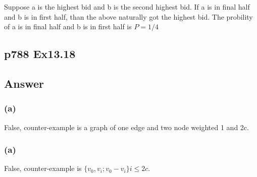 \documentclass[a4paper]{article}
\begin{document}
Suppose a is the highest bid and b is the second highest bid. If a is in final half and b is in first half, than the above naturally got the highest bid. The probility of a is in final half and b is in first half is $P=1/4$

\subsection*{p788 Ex13.18}
\subsection*{Answer}
\subsubsection*{(a)}
False, counter-example is a graph of one edge and two node weighted 1 and 2c.

\subsubsection*{(a)}
False, counter-example is $\{v_0,v_i; v_0-v_i\}i\leq 2c$.








%	

\end{document}
